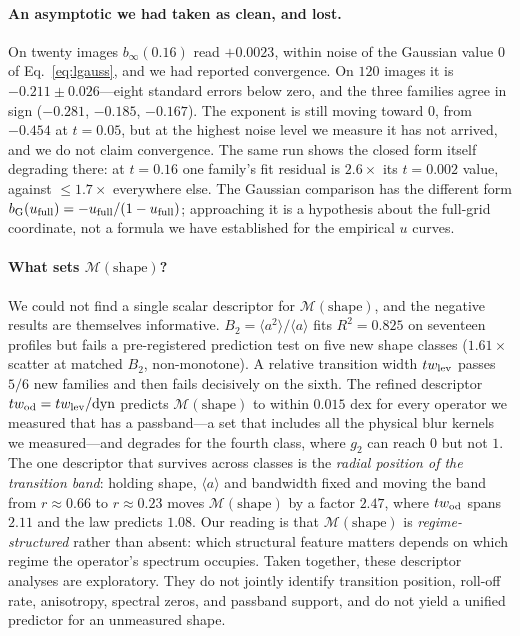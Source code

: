\documentclass[10pt,journal]{IEEEtran}
\begin{document}
\paragraph*{An asymptotic we had taken as clean, and lost.} On twenty images $b_\infty(0.16)$
read $+0.0023$, within noise of the Gaussian value $0$ of Eq.~\eqref{eq:lgauss}, and we had
reported convergence. On $120$ images it is $-0.211\pm0.026$---eight standard errors below zero,
and the three families agree in sign ($-0.281$, $-0.185$, $-0.167$). The exponent is still moving
toward $0$, from $-0.454$ at $t=0.05$, but at the highest noise level we measure it has not
arrived, and we do not claim convergence. The same run shows the closed form itself degrading
there: at $t=0.16$ one family's fit residual is $2.6\times$ its $t=0.002$ value, against
$\le1.7\times$ everywhere else. The Gaussian comparison has the different form
$b_{\rm G}(u_{\rm full})=-u_{\rm full}/(1-u_{\rm full})$; approaching it is a hypothesis about
the full-grid coordinate, not a formula we have established for the empirical $u$ curves.

\paragraph*{What sets $\mathcal M(\mathrm{shape})$?}
We could not find a single scalar descriptor for $\mathcal M(\mathrm{shape})$, and the negative results are themselves
informative. $B_2=\langle a^2\rangle/\langle a\rangle$ fits $R^2=0.825$ on seventeen profiles
but fails a pre-registered prediction test on five new shape classes ($1.61\times$ scatter at
matched $B_2$, non-monotone). A relative transition width $tw_{\rm lev}$ passes $5/6$ new
families and then fails decisively on the sixth. The refined descriptor
$tw_{\rm od}=tw_{\rm lev}/\text{dyn}$ predicts $\mathcal M(\mathrm{shape})$ to within $0.015$ dex for every operator
we measured that has a passband---a set that includes all the physical blur kernels we
measured---and degrades for the fourth class, where $g_2$ can reach $0$ but not $1$. The one descriptor that survives across classes is
the \emph{radial position of the transition band}: holding shape, $\langle a\rangle$ and
bandwidth fixed and moving the band from $r\approx0.66$ to $r\approx0.23$ moves $\mathcal M(\mathrm{shape})$ by a factor
$2.47$, where $tw_{\rm od}$ spans $2.11$ and the law predicts $1.08$. Our reading is that
$\mathcal M(\mathrm{shape})$ is \emph{regime-structured} rather than absent: which structural feature
matters depends on which regime the operator's spectrum occupies. Taken together, these descriptor
analyses are exploratory. They do not jointly identify transition position, roll-off rate,
anisotropy, spectral zeros, and passband support, and do not yield a unified predictor for an
unmeasured shape.
\end{document}
